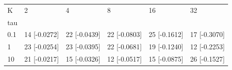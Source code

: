 \begin{tabular}{llllll}
\toprule
K & 2 & 4 & 8 & 16 & 32 \\
tau &  &  &  &  &  \\
\midrule
0.1 & 14 [-0.0272] & 22 [-0.0439] & 22 [-0.0803] & 25 [-0.1612] & 17 [-0.3070] \\
1 & 23 [-0.0254] & 23 [-0.0395] & 22 [-0.0681] & 19 [-0.1240] & 12 [-0.2253] \\
10 & 21 [-0.0217] & 15 [-0.0326] & 12 [-0.0517] & 15 [-0.0875] & 26 [-0.1527] \\
\bottomrule
\end{tabular}
